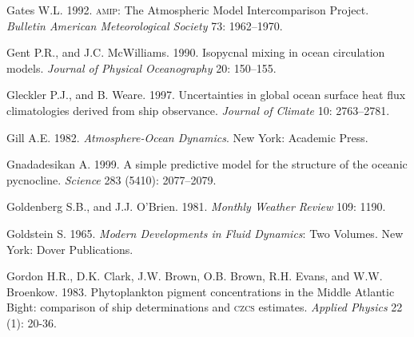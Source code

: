 \begin{thebibliography}{999}
Gates W.L.  1992. \textsc{amip}: The Atmospheric Model Intercomparison
Project.  \textit{Bulletin American Meteorological Society} 73:
1962--1970.
%

Gent P.R., and J.C. McWilliams.  1990. Isopycnal mixing in ocean
circulation models. \textit{Journal of Physical Oceanography} 20:
150--155.
%

Gleckler P.J., and B. Weare.  1997. Uncertainties in global ocean
surface heat flux climatologies derived from ship
observance. \textit{Journal of Climate} 10: 2763--2781.
%

Gill A.E.  1982. \textit{Atmosphere-Ocean Dynamics}. New York:
Academic Press.
%

Gnadadesikan A.  1999. A simple predictive model for the structure of
the oceanic pycnocline. \textit{Science} 283 (5410): 2077--2079.
%

Goldenberg S.B., and J.J. O'Brien. 1981. \textit{Monthly Weather
  Review} 109: 1190.
%

Goldstein S.  1965. \textit{Modern Developments in Fluid Dynamics}:
Two Volumes. New York: Dover Publications.
%

Gordon H.R., D.K. Clark, J.W. Brown, O.B. Brown, R.H. Evans, and W.W.
Broenkow. 1983. Phytoplankton pigment concentrations in the Middle
Atlantic Bight: comparison of ship determinations and \textsc{czcs}
estimates. \textit{Applied Physics} 22 (1): 20-36.
%


\end{thebibliography}
